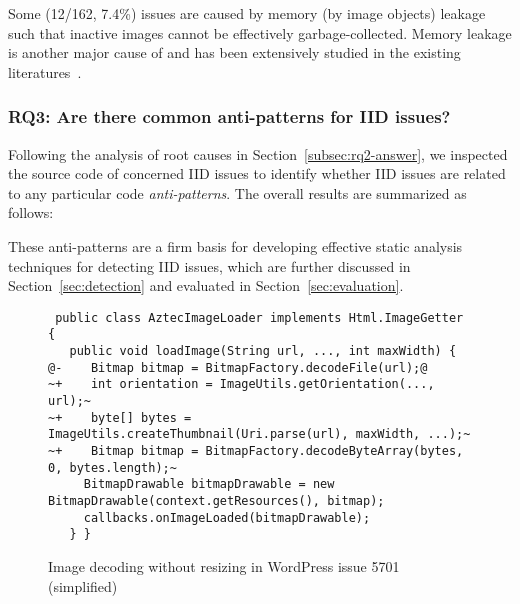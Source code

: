 Some (12/162, 7.4\%) issues are caused by memory (by image objects) leakage such that inactive images cannot be effectively garbage-collected.
Memory leakage is another major cause of  and has been extensively studied in the existing literatures~\cite{xu2008precise, yan2014leakchecker}.

\medskip

\subsubsection{RQ3: Are there common anti-patterns for IID issues?} \label{subsec:rq3-answer}

Following the analysis of root causes in Section~\ref{subsec:rq2-answer},
we inspected the source code of concerned IID issues to identify whether IID issues are related to any particular code \emph{anti-patterns}.
The overall results are summarized as follows:


These anti-patterns are a firm basis for developing effective static analysis techniques for detecting IID issues, which are further discussed in Section~\ref{sec:detection} and evaluated in Section~\ref{sec:evaluation}.

\begin{figure}
	\centering
	\begin{lstlisting}
 public class AztecImageLoader implements Html.ImageGetter {
   public void loadImage(String url, ..., int maxWidth) {
@-    Bitmap bitmap = BitmapFactory.decodeFile(url);@
~+    int orientation = ImageUtils.getOrientation(..., url);~
~+    byte[] bytes = ImageUtils.createThumbnail(Uri.parse(url), maxWidth, ...);~
~+    Bitmap bitmap = BitmapFactory.decodeByteArray(bytes, 0, bytes.length);~
     BitmapDrawable bitmapDrawable = new BitmapDrawable(context.getResources(), bitmap);
     callbacks.onImageLoaded(bitmapDrawable);
   } }
\end{lstlisting}
	\caption{Image decoding without resizing in WordPress issue 5701 (simplified)}
	\label{pattern1}
\end{figure}

